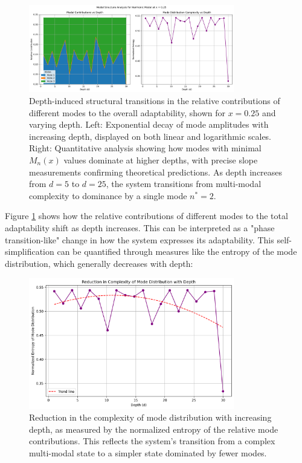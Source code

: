 \documentclass[11pt,a4paper]{article}
\begin{document}
\begin{figure}[H]
    \centering
    \includegraphics[width=0.8\textwidth]{figures/structural_transitions.png}
    \caption{Depth-induced structural transitions in the relative contributions of different modes to the overall adaptability, shown for $x = 0.25$ and varying depth. Left: Exponential decay of mode amplitudes with increasing depth, displayed on both linear and logarithmic scales. Right: Quantitative analysis showing how modes with minimal $M_n(x)$ values dominate at higher depths, with precise slope measurements confirming theoretical predictions. As depth increases from $d=5$ to $d=25$, the system transitions from multi-modal complexity to dominance by a single mode $n^*=2$.}
    \label{fig:structural_transitions}
\end{figure}

Figure \ref{fig:structural_transitions} shows how the relative contributions of different modes to the total adaptability shift as depth increases. This can be interpreted as a "phase transition-like" change in how the system expresses its adaptability. This self-simplification can be quantified through measures like the entropy of the mode distribution, which generally decreases with depth:

\begin{figure}[H]
    \centering
    \includegraphics[width=0.8\textwidth]{figures/complexity_reduction.png}
    \caption{Reduction in the complexity of mode distribution with increasing depth, as measured by the normalized entropy of the relative mode contributions. This reflects the system's transition from a complex multi-modal state to a simpler state dominated by fewer modes.}
    \label{fig:complexity_reduction}
\end{figure}
\end{document}
